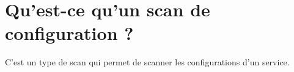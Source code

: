 \section{Qu’est-ce qu’un scan de configuration ?}
C'est un type de scan qui permet de scanner les configurations d'un service.